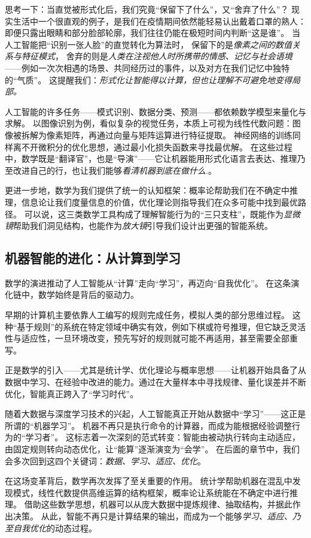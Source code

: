 思考一下：当直觉被形式化后，我们究竟“保留下了什么”，又“舍弃了什么”？  
现实生活中一个很直观的例子，是我们在疫情期间依然能轻易认出戴着口罩的熟人：即便只露出眼睛和部分脸部轮廓，我们往往仍能在极短时间内判断“这是谁”。  
当人工智能把“识别一张人脸”的直觉转化为算法时，  
保留下的是\emph{像素之间的数值关系与特征模式}，  
舍弃的则是\emph{人类在注视他人时所携带的情感、记忆与社会语境}——例如一次次相遇的场景、共同经历过的事件，以及对方在我们记忆中独特的“气质”。  
这提醒我们：\emph{形式化让智能得以计算，但也让理解不可避免地变得局部。}  

人工智能的许多任务——模式识别、数据分类、预测——都依赖数学模型来量化与求解。
以图像识别为例，看似复杂的视觉任务，本质上可视为线性代数问题：图像被拆解为像素矩阵，再通过向量与矩阵运算进行特征提取。
神经网络的训练同样离不开微积分的优化思想，通过最小化损失函数来寻找最优解。
在这些过程中，数学既是“翻译官”，也是“导演”——它让机器能用形式化语言去表达、推理乃至改进自己的行，也让我们能够\emph{看清机器到底在做什么}.。

更进一步地，数学为我们提供了统一的认知框架：概率论帮助我们在不确定中推理，信息论让我们度量信息的价值，优化理论则指导我们在众多可能中找到最优路径。
可以说，这三类数学工具构成了理解智能行为的“三只支柱”，既能作为\emph{显微镜}帮助我们洞见结构，也能作为\emph{放大镜}引导我们设计出更强的智能系统。  

\subsection{机器智能的进化：从计算到学习}
数学的演进推动了人工智能从“计算”走向“学习”，再迈向“自我优化”。
在这条演化链中，数学始终是背后的驱动力。

早期的计算机主要依靠人工编写的规则完成任务，模拟人类的部分思维过程。
这种“基于规则”的系统在特定领域中确实有效，例如下棋或符号推理，但它缺乏灵活性与适应性，一旦环境改变，预先写好的规则就可能不再适用，甚至需要全部重写。  

正是数学的引入——尤其是统计学、优化理论与概率思想——让机器开始具备了从数据中学习、在经验中改进的能力。通过在大量样本中寻找规律、量化误差并不断优化，智能真正跨入了“学习时代”。

随着大数据与深度学习技术的兴起，人工智能真正开始从数据中“学习”——这正是所谓的“机器学习”。
机器不再只是执行命令的计算器，而成为能根据经验调整行为的“学习者”。
这标志着一次深刻的范式转变：智能由被动执行转向主动适应，由固定规则转向动态优化，让“能算”逐渐演变为“会学”。
在后面的章节中，我们会多次回到这四个关键词：\emph{数据、学习、适应、优化}。  

在这场变革背后，数学再次发挥了至关重要的作用。
统计学帮助机器在混乱中发现模式，线性代数提供高维运算的结构框架，概率论让系统能在不确定中进行推理。
借助这些数学思想，机器可以从庞大数据中提炼规律、抽取结构，并据此作出决策。
从此，智能不再只是计算结果的输出，而成为一个能够\emph{学习、适应、乃至自我优化}的动态过程。

